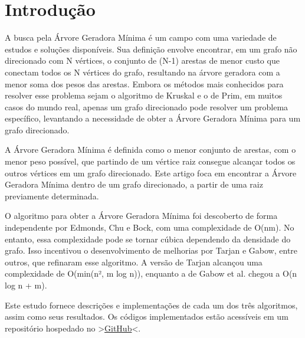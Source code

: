 \section{\esp Introdução}

A busca pela Árvore Geradora Mínima é um campo com uma variedade de estudos e soluções disponíveis. Sua definição envolve encontrar, em um grafo não direcionado com N vértices, o conjunto de (N-1) arestas de menor custo que conectam todos os N vértices do grafo, resultando na árvore geradora com a menor soma dos pesos das arestas. Embora os métodos mais conhecidos para resolver esse problema sejam o algoritmo de Kruskal e o de Prim, em muitos casos do mundo real, apenas um grafo direcionado pode resolver um problema específico, levantando a necessidade de obter a Árvore Geradora Mínima para um grafo direcionado.

A Árvore Geradora Mínima é definida como o menor conjunto de arestas, com o menor peso possível, que partindo de um vértice raiz consegue alcançar todos os outros vértices em um grafo direcionado. Este artigo foca em encontrar a Árvore Geradora Mínima dentro de um grafo direcionado, a partir de uma raiz previamente determinada.

O algoritmo para obter a Árvore Geradora Mínima foi descoberto de forma independente por Edmonds, Chu e Bock, com uma complexidade de O(nm). No entanto, essa complexidade pode se tornar cúbica dependendo da densidade do grafo. Isso incentivou o desenvolvimento de melhorias por Tarjan e Gabow, entre outros, que refinaram esse algoritmo. A versão de Tarjan alcançou uma complexidade de O(min(n², m log n)), enquanto a de Gabow et al. chegou a O(n log n + m).

Este estudo fornece descrições e implementações de cada um dos três algoritmos, assim como seus resultados. Os códigos implementados estão acessíveis em um repositório hospedado no >\href{https://github.com/thiagoteixas/TP-1-Grafos}{GitHub}<. 


